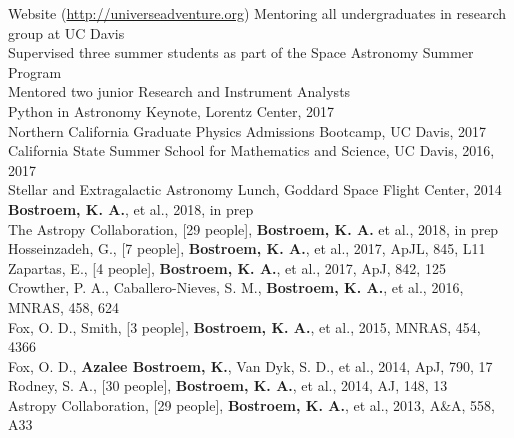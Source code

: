 \documentclass[10pt]{cv}
\begin{document}
\begin{llist}
\hspace*{24pt}Website ({\color{blue}\url{http://universeadventure.org}}) 
%
\vspace{-0.1in}  
Mentoring all undergraduates in research group at UC Davis\\
Supervised three summer students as part of the Space Astronomy Summer Program \\
Mentored two junior Research and Instrument Analysts\\
%
\vspace{-0.1in}  
Python in Astronomy Keynote, Lorentz Center, 2017\\
Northern California Graduate Physics Admissions Bootcamp, UC Davis, 2017\\
California State Summer School for Mathematics and Science, UC Davis, 2016, 2017\\
Stellar and Extragalactic Astronomy Lunch, Goddard Space Flight Center, 2014
%
\vspace{-0.1in}  
{\bf Bostroem, K. A.}, et al., 2018, in prep\\
The Astropy Collaboration, [29 people], {\bf Bostroem, K. A.} et al., 2018, in prep\\
Hosseinzadeh, G., [7 people], {\bf Bostroem, K. A.}, et al., 2017, ApJL, 845, L11\\
Zapartas, E., [4 people], {\bf Bostroem, K. A.}, et al., 2017, ApJ, 842, 125\\
Crowther, P. A., Caballero-Nieves, S. M., {\bf Bostroem, K. A.}, et al., 2016, MNRAS, 458, 624\\
Fox, O. D., Smith, [3 people], {\bf Bostroem, K. A.}, et al., 2015, MNRAS, 454, 4366\\
Fox, O. D., {\bf Azalee Bostroem, K.}, Van Dyk, S. D., et al., 2014, ApJ, 790, 17\\
Rodney, S. A., [30 people], {\bf Bostroem, K. A.}, et al., 2014, AJ, 148, 13\\
Astropy Collaboration, [29 people], {\bf Bostroem, K. A.}, et al., 2013, A\&A, 558, A33 \\
%
\vspace{-0.1in}   

\end{llist}
\end{document}
